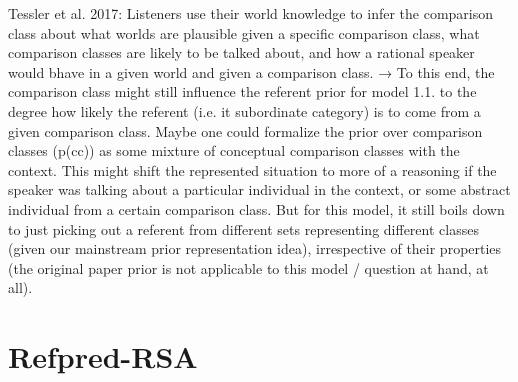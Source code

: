 Tessler et al. 2017: 
Listeners use their world knowledge to infer the comparison class about what worlds are plausible given a specific comparison class, what comparison classes are likely to be talked about, and how a rational speaker would bhave in a given world and given a comparison class. 
→ To this end, the comparison class might still influence the referent prior for model 1.1. to the degree how likely the referent (i.e. it subordinate category) is to come from a given comparison class. Maybe one could formalize the prior over comparison classes (p(cc)) as some mixture of conceptual comparison classes with the context. This might shift the represented situation to more of a reasoning if the speaker was talking about a particular individual in the context, or some abstract individual from a certain comparison class. But for this model, it still boils down to just picking out a referent from different sets representing different classes (given our mainstream prior representation idea), irrespective of their properties (the original paper prior is not applicable to this model / question at hand, at all).

\section{Refpred-RSA}

